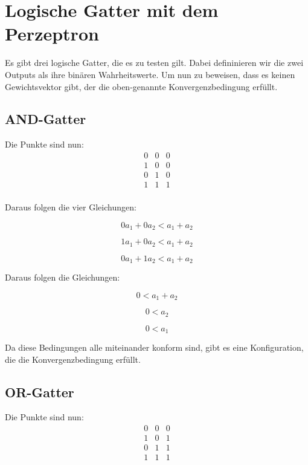 \documentclass[11pt]{article} %
\begin{document}
\section{Logische Gatter mit dem Perzeptron}

Es gibt drei logische Gatter, die es zu testen gilt. Dabei defininieren wir die zwei Outputs als ihre binären Wahrheitswerte. Um nun zu beweisen, dass es keinen Gewichtsvektor gibt, der die oben-genannte Konvergenzbedingung erfüllt. 
\subsection{AND-Gatter}
Die Punkte sind nun:
\begin{equation}
\begin{matrix}
0 & 0 & 0\\
1 & 0 & 0\\
0 & 1 & 0 \\
1 & 1 & 1 \\
\end{matrix} 
\end{equation}

Daraus folgen die vier Gleichungen:

\begin{equation}
0 a_{1} + 0 a_{2} < a_{1} + a_{2}
\end{equation}

\begin{equation}
1 a_{1} + 0 a_{2} < a_{1} + a_{2}
\end{equation}

\begin{equation}
0 a_{1} + 1 a_{2} < a_{1} + a_{2}
\end{equation}

Daraus folgen die Gleichungen:

\begin{equation}
0 < a_{1} + a_{2}
\end{equation}

\begin{equation}
0 < a_{2}
\end{equation}

\begin{equation}
0 < a_{1} 
\end{equation}

Da diese Bedingungen alle miteinander konform sind, gibt es eine Konfiguration, die die Konvergenzbedingung erfüllt.

\subsection{OR-Gatter}
Die Punkte sind nun:
\begin{equation}
\begin{matrix}
0 & 0 & 0\\
1 & 0 & 1\\
0 & 1 & 1 \\
1 & 1 & 1 \\
\end{matrix} 
\end{equation}
\end{document}
